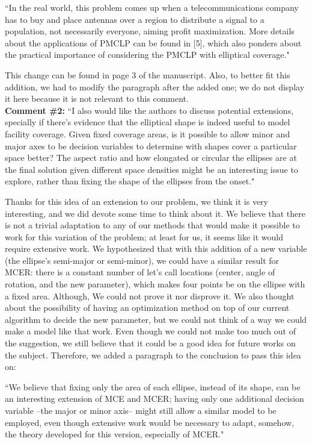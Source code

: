 		``In the real world, this problem comes up when a telecommunications company has to buy and
		place antennas over a region to distribute a signal to a population, not necessarily everyone, aiming
		profit maximization. More details about the applications of PMCLP can be found in [5], which also
		ponders about the practical importance of considering the PMCLP with elliptical coverage."
		
		This change can be found in page 3 of the manuscript. Also, to better fit this addition, we had to modify the paragraph after the added one; we do not display it here because it is not relevant to this comment.
		\\
		
		\textbf{Comment \#2:} ``I also would like the authors to discuss potential extensions, specially if there's evidence that the elliptical shape is indeed useful to model facility coverage. Given fixed coverage areas, is it possible to allow minor and major axes to be decision variables to determine with shapes cover a particular space better? The aspect ratio and how elongated or circular the ellipses are at the final solution given different space densities might be an interesting issue to explore, rather than fixing the shape of the ellipses from the onset."
		
		Thanks for this idea of an extension to our problem, we think it is very interesting, and we did devote some time to think about it.
		We believe that there is not a trivial adaptation to any of our methods that would make it possible to work for this variation of the problem; at least for us, it seems like it would require extensive work. 
		We hypothesized that with this addition of a new variable (the ellipse's semi-major or semi-minor), we could have a similar result for MCER: there is a constant number of let's call locations (center, angle of rotation, and the new parameter), which makes four points be on the ellipse with a fixed area. Although, We could not prove it nor disprove it.
		We also thought about the possibility of having an optimization method on top of our current algorithm to decide the new parameter, but we could not think of a way we could make a model like that work.
		Even though we could not make too much out of the suggestion, we still believe that it could be a good idea for future works on the subject. Therefore, we added a paragraph to the conclusion to pass this idea on:
		
		``We believe
		that fixing only the area of each ellipse, instead of its shape, can be an interesting extension of
		MCE and MCER; having only one additional decision variable –the major or minor axis– might
		still allow a similar model to be employed, even though extensive work would be necessary to
		adapt, somehow, the theory developed for this version, especially of MCER."
		
		
